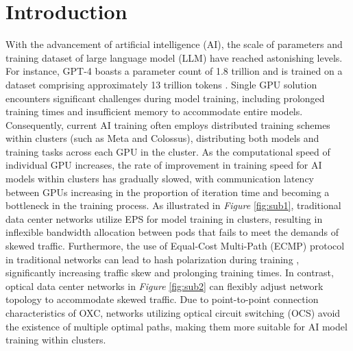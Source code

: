 \documentclass[conference]{IEEEtran}
\begin{document}
\section{Introduction}

With the advancement of artificial intelligence (AI), the scale of parameters and training dataset of large language model (LLM) have reached astonishing levels. For instance, GPT-4 boasts a parameter count of 1.8 trillion and is trained on a dataset comprising approximately 13 trillion tokens \cite{GPT4}. Single GPU solution encounters significant challenges during model training, including prolonged training times and insufficient memory to accommodate entire models. Consequently, current AI training often employs distributed training schemes \cite{surveyDML} within clusters (such as Meta \cite{Meta} and Colossus), distributing both models and training tasks across each GPU in the cluster. As the computational speed of individual GPU increases, the rate of improvement in training speed for AI models within clusters has gradually slowed, with communication latency between GPUs increasing in the proportion of iteration time and becoming a bottleneck in the training process. As illustrated in \emph{Figure} \ref{fig:sub1}, traditional data center networks utilize EPS for model training in clusters, resulting in inflexible bandwidth allocation between pods that fails to meet the demands of skewed traffic. Furthermore, the use of Equal-Cost Multi-Path (ECMP) protocol in traditional networks can lead to hash polarization during training \cite{HPN}, significantly increasing traffic skew and prolonging training times. In contrast, optical data center networks in \emph{Figure} \ref{fig:sub2} can flexibly adjust network topology to accommodate skewed traffic. Due to point-to-point connection characteristics of OXC, networks utilizing optical circuit switching (OCS) avoid the existence of multiple optimal paths, making them more suitable for AI model training within clusters.
\end{document}
